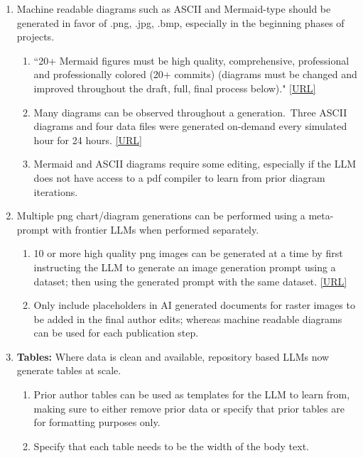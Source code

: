 \documentclass{article}
\begin{document}
\begin{enumerate}
\item Machine readable diagrams such as ASCII and Mermaid-type should be generated in favor of .png, .jpg, .bmp, especially in the beginning phases of projects. 
\begin{enumerate}
    \item “20+ Mermaid figures must be high quality, comprehensive, professional and professionally colored (20+ commits) (diagrams must be changed and improved throughout the draft, full, final process below)." \href{https://github.com/kevinkawchak/physical-ai-oncology-trials/blob/main/trial-protocol/prompts/prompt-protocol.md}{[URL]}\cite{2026OnPremis}
    \item Many diagrams can be observed throughout a generation.\ Three ASCII diagrams and four data files were generated on-demand every simulated hour for 24 hours.  \href{https://github.com/kevinkawchak/physical-ai-oncology-trials/tree/main/new-trial}{[URL]}  
    \item Mermaid and ASCII diagrams require some editing, especially if the LLM does not have access to a pdf compiler to learn from prior diagram iterations. 
\end{enumerate}
\item Multiple png chart/diagram generations can be performed using a meta-prompt with frontier LLMs when performed separately. 
\begin{enumerate}
    \item 10 or more high quality png images can be generated at a time by first instructing the LLM to generate an image generation prompt using a dataset; then using the generated prompt with the same dataset. \cite{2026MobPanCa}\href{https://github.com/kevinkawchak/cancer-automated/tree/main/papers/VVUQ-01}{[URL]}
    \item Only include placeholders in AI generated documents for raster images to be added in the final author edits; whereas machine readable diagrams can be used for each publication step. 
\end{enumerate}
\item \textbf{Tables:} Where data is clean and available, repository based LLMs now generate tables at scale. 
\begin{enumerate}
    \item Prior author tables can be used as templates for the LLM to learn from, making sure to either remove prior data or specify that prior tables are for formatting purposes only. 
    \item Specify that each table needs to be the width of the body text.

\end{enumerate}
\end{enumerate}
\end{document}
